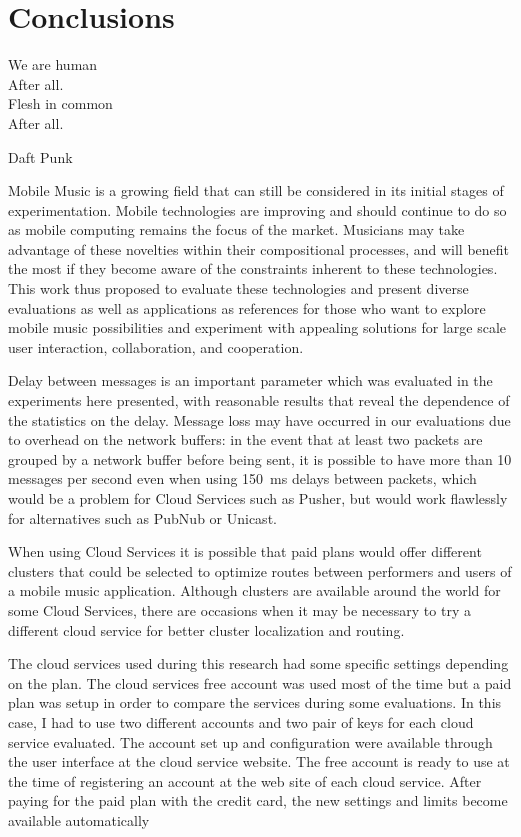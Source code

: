 \chapter{Conclusions}
\label{cap:conclusions}

 \epigraph{
	We are human \\
	After all. \\
	Flesh in common \\
	After all.}
 {Daft Punk}

Mobile Music is a growing field that can still be considered in its initial stages of experimentation.
Mobile technologies are improving and should continue to do so as mobile computing remains the focus of the market.
Musicians may take advantage of these novelties within their compositional processes, and will benefit the most if they become aware of the constraints inherent to these technologies.
This work thus proposed to evaluate these technologies and present diverse evaluations as well as applications as references for those who want to explore mobile music possibilities and experiment with appealing solutions for large scale user interaction, collaboration, and cooperation. 

Delay between messages is an important parameter which was evaluated in the experiments here presented, with reasonable results that reveal the dependence of the statistics on the delay.
Message loss may have occurred in our evaluations due to overhead on the network buffers:
in the event that at least two packets are grouped by a network buffer before being sent, it is possible to have more than 10 messages per second even when using 150~ms delays between packets, which would be a problem for Cloud Services such as Pusher, but would work flawlessly for alternatives such as PubNub or Unicast.

When using Cloud Services it is possible that paid plans would offer different clusters that could be selected to optimize routes between performers and users of a mobile music application.
Although clusters are available around the world for some Cloud Services, there are occasions when it may be necessary to try a different cloud service for better cluster localization and routing.

The cloud services used during this research had some specific settings depending on the plan. 
The cloud services free account was used most of the time but a paid plan was setup in order to compare the services during some evaluations.
In this case, I had to use two different accounts and two pair of keys for each cloud service evaluated.
The account set up and configuration were available through the user interface at the cloud service website.
The free account is ready to use at the time of registering an account at the web site of each cloud service.
After paying for the paid plan with the credit card, the new settings and limits become available automatically


